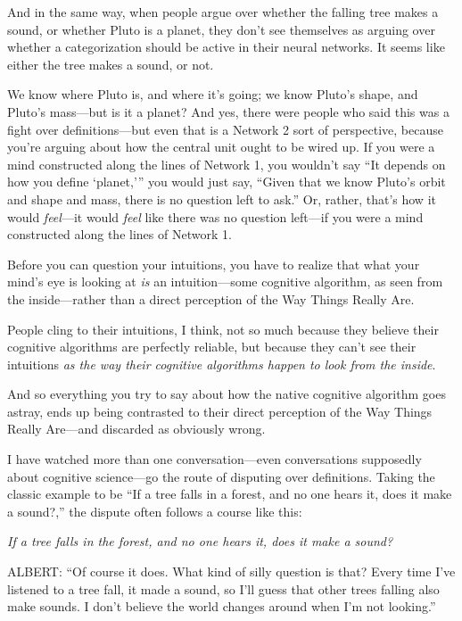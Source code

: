 {
 And in the same way, when people argue over whether the falling
tree makes a sound, or whether Pluto is a planet, they
don't see themselves as arguing over whether a
categorization should be active in their neural networks. It seems like
either the tree makes a sound, or not.}

{
 We know where Pluto is, and where it's going; we
know Pluto's shape, and Pluto's
mass---but is it a planet? And yes, there were people who said this was
a fight over definitions---but even that is a Network 2 sort of
perspective, because you're arguing about how the
central unit ought to be wired up. If you were a mind constructed along
the lines of Network 1, you wouldn't say
``It depends on how you define
`planet,''' you would
just say, ``Given that we know Pluto's
orbit and shape and mass, there is no question left to
ask.'' Or, rather, that's how it
would \textit{feel}{}---it would \textit{feel} like there was no
question left---if you were a mind constructed along the lines of
Network 1.}

{
 Before you can question your intuitions, you have to realize that
what your mind's eye is looking at \textit{is} an
intuition---some cognitive algorithm, as seen from the inside---rather
than a direct perception of the Way Things Really Are.}

{
 People cling to their intuitions, I think, not so much because
they believe their cognitive algorithms are perfectly reliable, but
because they can't see their intuitions \textit{as the
way their cognitive algorithms happen to look from the inside}.}

{
 And so everything you try to say about how the native cognitive
algorithm goes astray, ends up being contrasted to their direct
perception of the Way Things Really Are---and discarded as obviously
wrong.}

\myendsectiontext


{
 I have watched more than one conversation---even conversations
supposedly about cognitive science---go the route of disputing over
definitions. Taking the classic example to be ``If a
tree falls in a forest, and no one hears it, does it make a
sound?,'' the dispute often follows a course like
this:}

{
 \textit{If a tree falls in the forest, and no one hears it, does
it make a sound?}}

{
 ALBERT: ``Of course it does. What kind of silly
question is that? Every time I've listened to a tree
fall, it made a sound, so I'll guess that other trees
falling also make sounds. I don't believe the world
changes around when I'm not
looking.''}

